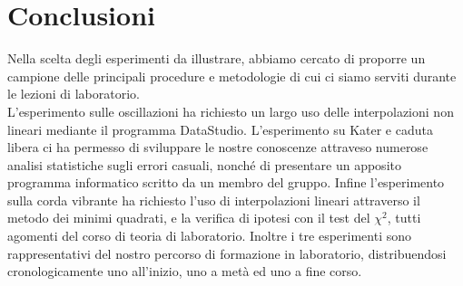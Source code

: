 \appendix
\chapter{Conclusioni}
Nella scelta degli esperimenti da illustrare, abbiamo cercato di proporre un campione delle principali procedure e metodologie di cui ci siamo serviti durante le lezioni di laboratorio.\\
L'esperimento sulle oscillazioni ha richiesto un largo uso delle interpolazioni non lineari mediante il programma DataStudio.
L'esperimento su Kater e caduta libera ci ha permesso di sviluppare le nostre conoscenze attraveso numerose analisi statistiche sugli errori casuali, nonché di presentare un apposito programma informatico scritto da un membro del gruppo.
Infine l'esperimento sulla corda vibrante ha richiesto l'uso di interpolazioni lineari attraverso il metodo dei minimi quadrati, e la verifica di ipotesi con il test del $\chi^2$, tutti agomenti del corso di teoria di laboratorio.
Inoltre i tre esperimenti sono rappresentativi del nostro percorso di formazione in laboratorio, distribuendosi cronologicamente uno all'inizio, uno a metà ed uno a fine corso.   


